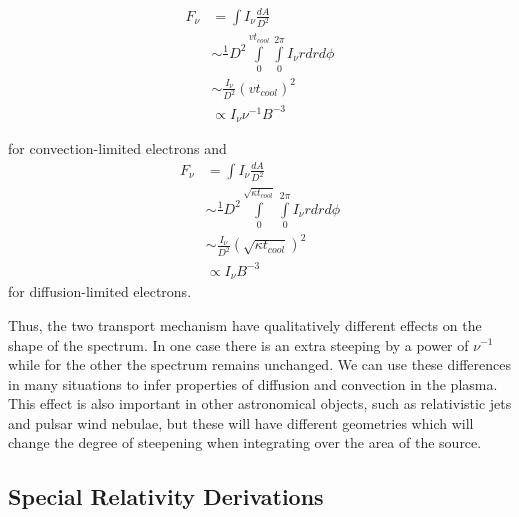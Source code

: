 \documentclass{article}
\def\inv#1{\frac1{#1}}
\def\inv#1{{\frac{1}{}#1}}
\begin{document}
 $$\begin{aligned}
F_\nu &= \int I_\nu \frac{dA}{D^2} \\
&\sim \inv{D^2} \int \limits ^{vt_{cool}}_{0} \int \limits ^{2\pi}_{0} I_\nu rdrd\phi\\
&\sim \frac{I_\nu}{D^2}(vt_{cool})^2 \\
&\propto I_\nu \nu^{-1}B^{-3}\end{aligned}$$ 

for convection-limited electrons and 
 $$\begin{aligned}
F_\nu &= \int I_\nu \frac{dA}{D^2} \\
&\sim \inv{D^2} \int \limits ^{\sqrt{\kappa t_{cool}}}_{0} \int \limits ^{2\pi}_{0} I_\nu rdrd\phi\\
&\sim \frac{I_\nu}{D^2}(\sqrt{\kappa t_{cool}})^2 \\
&\propto I_\nu B^{-3}\end{aligned}$$
for diffusion-limited electrons. 

Thus, the two transport mechanism have qualitatively different effects on the shape of the spectrum.  In one case there is an extra steeping by a power of $\nu^{-1}$ while for the other the spectrum remains unchanged.  We can use these differences in many situations to infer properties of diffusion and convection in the plasma. This effect is also important in other astronomical objects, such as relativistic jets and pulsar wind nebulae, but these will have different geometries which will change the degree of steepening when integrating over the area of the source.

\subsection{Special Relativity Derivations}
\end{document}
